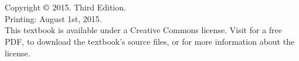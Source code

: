 \chapter*{}
\vfill

\noindent Copyright $\copyright$ 2015. Third Edition. \\
Printing: August 1st, 2015. \\

\noindent This textbook is available under a Creative Commons license. Visit  for a free PDF, to download the textbook's source files, or for more information about the license. \\


